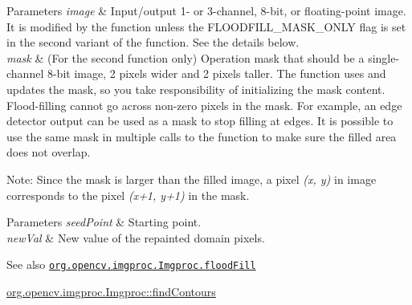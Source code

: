 \begin{DoxyParams}{Parameters}
{\em image} & Input/output 1-\/ or 3-\/channel, 8-\/bit, or floating-\/point image. It is modified by the function unless the {\ttfamily F\+L\+O\+O\+D\+F\+I\+L\+L\+\_\+\+M\+A\+S\+K\+\_\+\+O\+N\+LY} flag is set in the second variant of the function. See the details below. \\
\hline
{\em mask} & (For the second function only) Operation mask that should be a single-\/channel 8-\/bit image, 2 pixels wider and 2 pixels taller. The function uses and updates the mask, so you take responsibility of initializing the {\ttfamily mask} content. Flood-\/filling cannot go across non-\/zero pixels in the mask. For example, an edge detector output can be used as a mask to stop filling at edges. It is possible to use the same mask in multiple calls to the function to make sure the filled area does not overlap.\\
\hline
\end{DoxyParams}


Note\+: Since the mask is larger than the filled image, a pixel {\itshape (x, y)} in {\ttfamily image} corresponds to the pixel {\itshape (x+1, y+1)} in the {\ttfamily mask}.


\begin{DoxyParams}{Parameters}
{\em seed\+Point} & Starting point. \\
\hline
{\em new\+Val} & New value of the repainted domain pixels.\\
\hline
\end{DoxyParams}
\begin{DoxySeeAlso}{See also}
\href{http://docs.opencv.org/modules/imgproc/doc/miscellaneous_transformations.html#floodfill}{\tt org.\+opencv.\+imgproc.\+Imgproc.\+flood\+Fill} 

\mbox{\hyperlink{classorg_1_1opencv_1_1imgproc_1_1_imgproc_a60284da5baddfe0b44c6553177de8bf9}{org.\+opencv.\+imgproc.\+Imgproc\+::find\+Contours}} 
\end{DoxySeeAlso}
\mbox{\label{classorg_1_1opencv_1_1imgproc_1_1_imgproc_a1f720ad6bef4616a3268c98abd811350}} 
